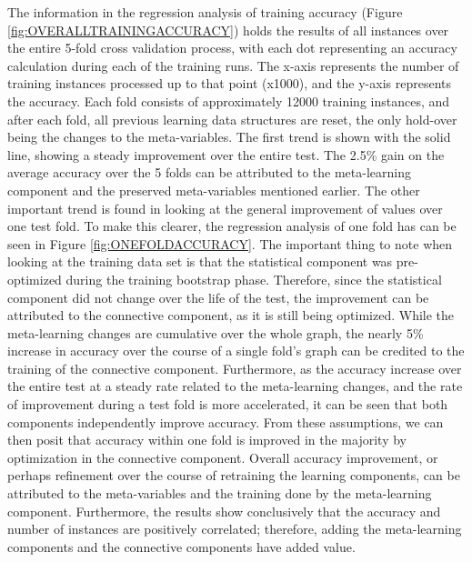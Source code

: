 The information in the regression analysis of training
accuracy (Figure \ref{fig:OVERALLTRAININGACCURACY}) holds the results of all instances
over the entire 5-fold cross validation process, with each dot representing an accuracy
calculation during each of the training runs. The x-axis represents the 
number of training instances processed up to that point (x1000), and the y-axis 
represents the accuracy. Each fold consists of approximately 12000 training 
instances, and after each fold, all previous learning data structures are reset, 
the only hold-over being the changes to the meta-variables. The first trend is shown 
with the solid line, showing a steady improvement over the entire test. 
The 2.5\% gain on the average accuracy over the 5 folds can be attributed to the 
meta-learning component and the preserved meta-variables mentioned earlier. The 
other important trend is found in looking at the general
improvement of values over one test fold. To make this clearer, the regression
analysis of one fold has can be seen in Figure \ref{fig:ONEFOLDACCURACY}.  The important
thing to note when looking at the training data set is that the statistical component was
pre-optimized during the training bootstrap phase.  Therefore, since the
statistical component did not change over the life of the test, the improvement
can be attributed to the connective component, as it is still being optimized. 
While the meta-learning changes are cumulative over the whole graph, the nearly 
5\% increase in accuracy over the course of a single fold's graph can be credited 
to the training of the connective component. Furthermore, as the accuracy 
increase over the entire test at a steady rate related to the meta-learning changes, and the rate of
improvement during a test fold is more accelerated, it can be seen that both
components independently improve accuracy.  From these assumptions, we can then 
posit that accuracy within one fold is improved in the majority by 
optimization in the connective component.  Overall accuracy improvement, or 
perhaps refinement over the course of retraining the learning components, can be 
attributed to the meta-variables and the training done by the meta-learning 
component. Furthermore, the results show conclusively that the accuracy and 
number of instances are positively correlated; therefore, adding the meta-learning 
components and the connective components have added value.


